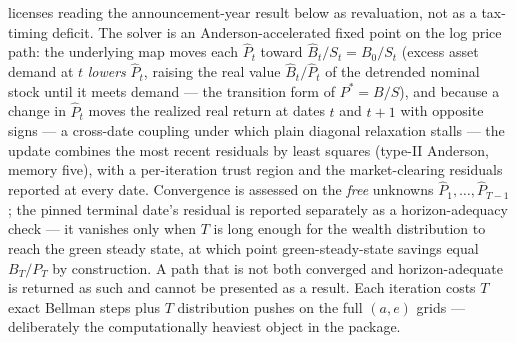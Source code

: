 \documentclass[12pt]{article}
\newcommand{\Sfun}{S}
\begin{document}
licenses reading the announcement-year result below as revaluation, not as a
tax-timing deficit. The solver is an
Anderson-accelerated fixed point on the log price path: the underlying map
moves each $\hat P_t$ toward $\hat B_t/\Sfun_t=B_0/\Sfun_t$ (excess asset
demand at $t$
\emph{lowers} $\hat P_t$, raising the real value $\hat B_t/\hat P_t$ of the
detrended nominal stock until it meets demand --- the transition form of
$P^{*}=B/\Sfun$), and because a change in $\hat P_t$ moves the realized real
return at dates $t$ and $t+1$ with opposite signs --- a cross-date
coupling under which plain diagonal relaxation stalls --- the update
combines the most recent residuals by least squares (type-II Anderson,
memory five), with a per-iteration trust region and the market-clearing
residuals reported at every date. Convergence is assessed on the
\emph{free} unknowns $\hat P_1,\dots,\hat P_{T-1}$; the pinned terminal
date's residual is reported separately as a horizon-adequacy check --- it
vanishes only when $T$ is long enough for the wealth distribution to
reach the green steady state, at which point green-steady-state savings
equal $B_T/P_T$ by construction. A path that is not both converged and
horizon-adequate is returned as such and cannot be presented as a result.
Each iteration costs $T$ exact Bellman steps plus $T$
distribution pushes on the full $(a,e)$ grids --- deliberately the
computationally heaviest object in the package.
\end{document}
